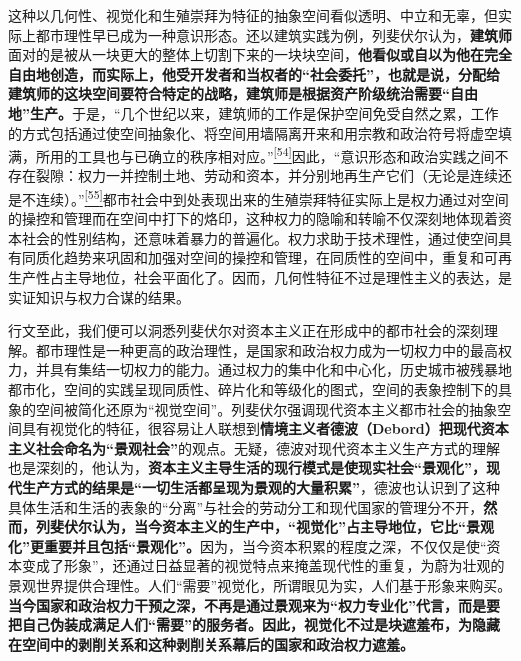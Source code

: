 \documentclass[UTF8, fontset = sourcesans, a4paper, oneside, zihao =
-4, scheme=chinese, no-math, space=true]{ctexbook}
\begin{document}
这种以几何性、视觉化和生殖崇拜为特征的抽象空间看似透明、中立和无辜，但实际上都市理性早已成为一种意识形态。还以建筑实践为例，列斐伏尔认为，\textbf{建筑师}面对的是被从一块更大的整体上切割下来的一块块空间，\textbf{他看似或自以为他在完全自由地创造，而实际上，他受开发者和当权者的``社会委托''，也就是说，分配给建筑师的这块空间要符合特定的战略，建筑师是根据资产阶级统治需要``自由地''生产。}于是，``几个世纪以来，建筑师的工作是保护空间免受自然之累，工作的方式包括通过使空间抽象化、将空间用墙隔离开来和用宗教和政治符号将虚空填满，所用的工具也与已确立的秩序相对应。''\protect\hypertarget{part0007_split_003.htmlux5cux23w54}{}{}\protect\hyperlink{part0007_split_004.htmlux5cux23m54}{\textsuperscript{{[}54{]}}}因此，``意识形态和政治实践之间不存在裂隙：权力一并控制土地、劳动和资本，并分别地再生产它们（无论是连续还是不连续）。''\protect\hypertarget{part0007_split_003.htmlux5cux23w55}{}{}\protect\hyperlink{part0007_split_004.htmlux5cux23m55}{\textsuperscript{{[}55{]}}}都市社会中到处表现出来的生殖崇拜特征实际上是权力通过对空间的操控和管理而在空间中打下的烙印，这种权力的隐喻和转喻不仅深刻地体现着资本社会的性别结构，还意味着暴力的普遍化。权力求助于技术理性，通过使空间具有同质化趋势来巩固和加强对空间的操控和管理，在同质性的空间中，重复和可再生产性占主导地位，社会平面化了。因而，几何性特征不过是理性主义的表达，是实证知识与权力合谋的结果。

行文至此，我们便可以洞悉列斐伏尔对资本主义正在形成中的都市社会的深刻理解。都市理性是一种更高的政治理性，是国家和政治权力成为一切权力中的最高权力，并具有集结一切权力的能力。通过权力的集中化和中心化，历史城市被残暴地都市化，空间的实践呈现同质性、碎片化和等级化的图式，空间的表象控制下的具象的空间被简化还原为``视觉空间''。列斐伏尔强调现代资本主义都市社会的抽象空间具有视觉化的特征，很容易让人联想到\textbf{情境主义者德波（Debord）把现代资本主义社会命名为``景观社会''}的观点。无疑，德波对现代资本主义生产方式的理解也是深刻的，他认为，\textbf{资本主义主导生活的现行模式是使现实社会``景观化''，现代生产方式的结果是``一切生活都呈现为景观的大量积累''}，德波也认识到了这种具体生活和生活的表象的``分离''与社会的劳动分工和现代国家的管理分不开，\textbf{然而，列斐伏尔认为，当今资本主义的生产中，``视觉化''占主导地位，它比``景观化''更重要并且包括``景观化''。}因为，当今资本积累的程度之深，不仅仅是使``资本变成了形象''，还通过日益显著的视觉特点来掩盖现代性的重复，为蔚为壮观的景观世界提供合理性。人们``需要''视觉化，所谓眼见为实，人们基于形象来购买。\textbf{当今国家和政治权力干预之深，不再是通过景观来为``权力专业化''代言，而是要把自己伪装成满足人们``需要''的服务者。因此，视觉化不过是块遮羞布，为隐藏在空间中的剥削关系和这种剥削关系幕后的国家和政治权力遮羞。}
\end{document}
